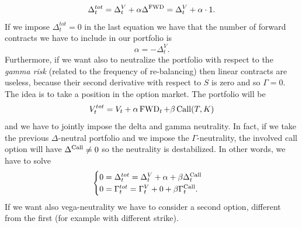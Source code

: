 \begin{equation}
    \Delta_t^{tot} = \Delta_t^V + \alpha\Delta^{\operatorname{FWD}} = \Delta_t^V + \alpha\cdot 1.
\end{equation}
If we impose $\Delta_t^{tot}=0$ in the last equation we have that the number of forward contracts we have to include in our portfolio is
\begin{equation}
    \alpha = -\Delta^V_t.
\end{equation}
Furthermore, if we want also to neutralize the portfolio with respect to the \emph{gamma risk} (related to the frequency of re-balancing) then linear contracts are useless, because their second derivative with respect to $S$ is zero and so $\Gamma=0$. The idea is to take a position in the option market. The portfolio will be
\begin{equation}
    V^{tot}_t = V_t + \alpha\operatorname{FWD}_t + \beta \operatorname{Call}(T,K)
\end{equation}
and we have to jointly impose the delta and gamma neutrality. In fact, if we take the previous $\Delta$-neutral portfolio and we impose the $\Gamma$-neutrality, the involved call option will have $\Delta^{\operatorname{Call}}\ne0$ so the neutrality is destabilized. In other words, we have to solve
\begin{equation}
    \begin{cases}
    0 = \Delta^{tot}_t = \Delta_t^V + \alpha + \beta\Delta^{\operatorname{Call}}_t \\
    0 = \Gamma^{tot}_t = \Gamma^V_t + 0 + \beta \Gamma^{\operatorname{Call}}_t.
    \end{cases}
\end{equation}
If we want also vega-neutrality we have to consider a second option, different from the first (for example with different strike).
